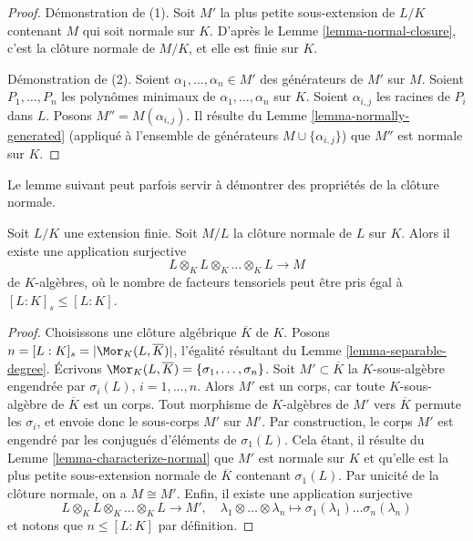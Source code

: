 \begin{proof}
Démonstration de (1). Soit $M'$ la plus petite sous-extension de $L/K$ contenant $M$
qui soit normale sur $K$. D'après le Lemme \ref{lemma-normal-closure},
c'est la clôture normale de $M/K$, et elle est finie sur $K$.

\medskip\noindent
Démonstration de (2). Soient $\alpha_1, \ldots, \alpha_n \in M'$ des générateurs de $M'$ sur $M$.
Soient $P_1, \ldots, P_n$ les polynômes minimaux de
$\alpha_1, \ldots, \alpha_n$ sur $K$. Soient $\alpha_{i, j}$ les racines
de $P_i$ dans $L$. Posons $M''  = M(\alpha_{i, j})$. Il résulte du
Lemme \ref{lemma-normally-generated}
(appliqué à l'ensemble de générateurs $M \cup \{\alpha_{i, j}\}$)
que $M''$ est normale sur $K$.
\end{proof}

\noindent
Le lemme suivant peut parfois servir à démontrer des propriétés
de la clôture normale.

\begin{lemma}
\label{lemma-normal-closure-tensor-product}
Soit $L/K$ une extension finie. Soit $M/L$ la clôture
normale de $L$ sur $K$. Alors il existe une application surjective
$$
L \otimes_K L \otimes_K \ldots \otimes_K L \longrightarrow M
$$
de $K$-algèbres, où le nombre de facteurs tensoriels peut être pris égal à
$[L : K]_s \leq [L : K]$.
\end{lemma}

\begin{proof}
Choisissons une clôture algébrique $\overline{K}$ de $K$.
Posons $n = [L : K]_s = |\Mor_K(L, \overline{K})|$, l'égalité résultant du
Lemme \ref{lemma-separable-degree}.
Écrivons $\Mor_K(L, \overline{K}) = \{\sigma_1, \ldots, \sigma_n\}$.
Soit $M' \subset \overline{K}$ la $K$-sous-algèbre
engendrée par $\sigma_i(L)$, $i = 1, \ldots, n$. Alors $M'$ est
un corps, car toute $K$-sous-algèbre de $\overline{K}$ est un corps.
Tout morphisme de $K$-algèbres de $M'$ vers $\overline{K}$ permute les $\sigma_i$,
et envoie donc le sous-corps $M'$ sur $M'$. Par construction, le corps $M'$
est engendré par les conjugués d'éléments de $\sigma_1(L)$. Cela étant,
il résulte du Lemme \ref{lemma-characterize-normal}
que $M'$ est normale sur $K$ et qu'elle est la
plus petite sous-extension normale de $\overline{K}$ contenant
$\sigma_1(L)$. Par unicité de la clôture normale, on a $M \cong M'$.
Enfin, il existe une application surjective
$$
L \otimes_K L \otimes_K \ldots \otimes_K L \longrightarrow M',
\quad
\lambda_1 \otimes \ldots \otimes \lambda_n \longmapsto
\sigma_1(\lambda_1) \ldots \sigma_n(\lambda_n)
$$
et notons que $n \leq [L : K]$ par définition.
\end{proof}












